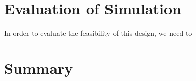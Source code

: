 








\section{Evaluation of Simulation} \label{sileval}
In order to evaluate the feasibility of this design,
we need to 
\section {Summary}
